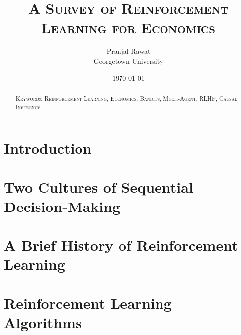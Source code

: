 %





\title{\textsc{A Survey of Reinforcement Learning for Economics}}
\author{Pranjal Rawat \\ Georgetown University}
\date{\today}

\maketitle

\begin{abstract}
\noindent

\bigskip

\noindent \textsc{Keywords: Reinforcement Learning, Economics, Bandits, Multi-Agent, RLHF, Causal Inference}
\end{abstract}

\tableofcontents
\newpage

\section{Introduction}\label{section:intro}


\section{Two Cultures of Sequential Decision-Making}\label{section:language}


\section{A Brief History of Reinforcement Learning}\label{section:history}


\section{Reinforcement Learning Algorithms}\label{section:rl_algorithms}


